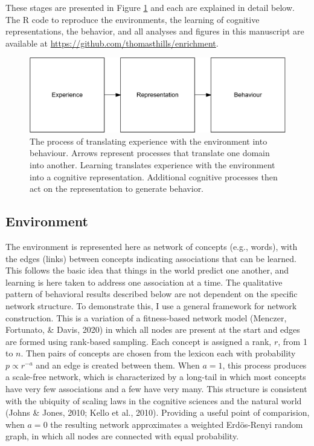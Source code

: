 \documentclass[
  man,floatsintext]{apa6}
\begin{document}
These stages are presented in Figure \ref{fig:Figure1} and each are explained in detail below. The R code to reproduce the environments, the learning of cognitive representations, the behavior, and all analyses and figures in this manuscript are available at \url{https://github.com/thomasthills/enrichment}.

\begin{figure}
\centering
\includegraphics{Enrichment_files/figure-latex/Figure1-1.pdf}
\caption{\label{fig:Figure1}The process of translating experience with the environment into behaviour. Arrows represent processes that translate one domain into another. Learning translates experience with the environment into a cognitive representation. Additional cognitive processes then act on the representation to generate behavior.}
\end{figure}

\hypertarget{environment}{%
\subsection{Environment}\label{environment}}

The environment is represented here as network of concepts (e.g., words), with the edges (links) between concepts indicating associations that can be learned. This follows the basic idea that things in the world predict one another, and learning is here taken to address one association at a time. The qualitative pattern of behavioral results described below are not dependent on the specific network structure. To demonstrate this, I use a general framework for network construction. This is a variation of a fitness-based network model (Menczer, Fortunato, \& Davis, 2020) in which all nodes are present at the start and edges are formed using rank-based sampling. Each concept is assigned a rank, \(r\), from 1 to \(n\). Then pairs of concepts are chosen from the lexicon each with probability \(p \propto r^{-a}\) and an edge is created between them. When \(a=1\), this process produces a scale-free network, which is characterized by a long-tail in which most concepts have very few associations and a few have very many. This structure is consistent with the ubiquity of scaling laws in the cognitive sciences and the natural world (Johns \& Jones, 2010; Kello et al., 2010). Providing a useful point of comparision, when \(a=0\) the resulting network approximates a weighted Erdös-Renyi random graph, in which all nodes are connected with equal probability.
\end{document}
